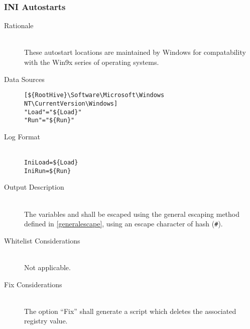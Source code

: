 \subsubsection{INI Autostarts}
\begin{description}
\item[Rationale] \hfill \\
These autostart locations are maintained by Windows for compatability with the
Win9x series of operating systems.
\item[Data Sources] \hfill
\vspace{-\baselineskip}
\begin{verbatim}
[${RootHive}\Software\Microsoft\Windows NT\CurrentVersion\Windows]
"Load"="${Load}"
"Run"="${Run}"
\end{verbatim}
\item[Log Format] \hfill \\
\verb|IniLoad=${Load}| \\
\verb|IniRun=${Run}|
\item[Output Description] \hfill \\
The variables  and  shall be escaped using the general
escaping method defined in \ref{generalescape}, using an escape character of
hash (\verb|#|).
\item[Whitelist Considerations] \hfill \\
Not applicable.
\item[Fix Considerations] \hfill \\
The option ``Fix'' shall generate a script which deletes the associated
registry value.
\end{description}

